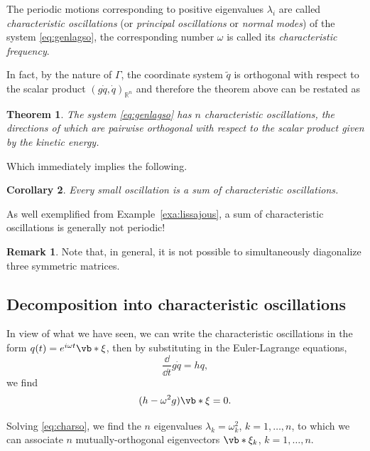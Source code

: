 \documentclass[english,fontsize=11pt,paper=b5]{scrbook}
\newtheorem{theorem}{Theorem}[chapter]
\newtheorem{corollary}[theorem]{Corollary}
\theoremstyle{definition}
\newtheorem{remark}{Remark}[chapter]
\begin{document}
    \begin{tcolorbox}
      The periodic motions corresponding to positive eigenvalues $\lambda_i$ are called \emph{characteristic oscillations} (or \emph{principal oscillations} or \emph{normal modes}) of the system \eqref{eq:genlagso}, the corresponding number $\omega$ is called its \emph{characteristic frequency}.
    \end{tcolorbox}

    In fact, by the nature of $\Gamma$, the coordinate system $\widetilde q$ is orthogonal with respect to the scalar product $(g\dot q, \dot q)_{\mathbb{R}^n}$ and therefore the theorem above can be restated as
    \begin{theorem}
      The system \eqref{eq:genlagso} has $n$ characteristic oscillations, the directions of which are pairwise orthogonal with respect to the scalar product given by the kinetic energy.
    \end{theorem}

    Which immediately implies the following.

    \begin{corollary}
      Every small oscillation is a sum of characteristic oscillations.
    \end{corollary}

    As well exemplified from Example~\ref{exa:lissajous}, a sum of characteristic oscillations is generally not periodic!

    \begin{remark}
      Note that, in general, it is not possible to simultaneously diagonalize three symmetric matrices.
    \end{remark}

    \subsection{Decomposition into characteristic oscillations}\label{eq:decomposition}

    In view of what we have seen, we can write the characteristic oscillations in the form $q(t) = e^{i\omega t} \vb*{\xi}$, then by substituting in the Euler-Lagrange equations,
    \begin{equation}
      \frac{\dd}{\dd t} g \dot q = h q,
    \end{equation}
    we find
    \begin{equation}
      (h - \omega^2 g)\vb*{\xi} = 0.
    \end{equation}

    Solving \eqref{eq:charso}, we find the $n$ eigenvalues $\lambda_k = \omega_k^2$, $k=1, \ldots, n$, to which we can associate $n$ mutually-orthogonal eigenvectors $\vb*{\xi}_k$, $k=1, \ldots, n$.
\end{document}
